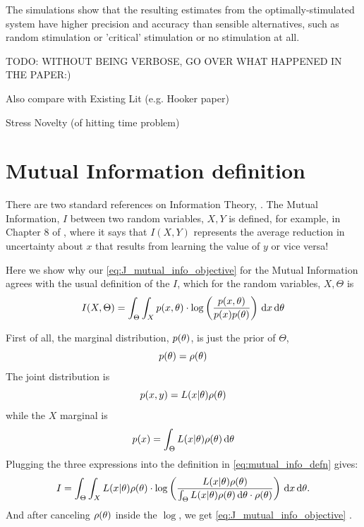 \documentclass{article}
\begin{document}
The simulations show that the resulting estimates from the
optimally-stimulated system have higher precision and accuracy than sensible
alternatives, such as random stimulation or 'critical' stimulation or no
 stimulation at all.
 
TODO: WITHOUT BEING VERBOSE, GO OVER WHAT HAPPENED IN THE PAPER:)

Also compare with Existing Lit (e.g. Hooker paper)

Stress Novelty (of hitting time problem)
 

\clearpage
\appendix
\section{Mutual Information definition}
\label{sec:mutual_info_defn} 

There are two standard references on Information Theory, 
\cite{Cover2006,MacKay2003}. The Mutual Information, $I$ between two random
variables, $X,Y$ is defined, for example, in Chapter 8 of \cite{MacKay2003},
where it says that $I(X,Y)$ represents the average reduction in uncertainty
about $x$ that results from learning the value of $y$ or vice versa! 

Here we show why our \cref{eq:J_mutual_info_objective} for the Mutual
Information agrees with the usual definition of the $I$,
which for the random variables, $X,\Theta$ is
\begin{equation} 
I(X,\Theta) = \int_\Theta \int_X p(x,{\theta}) \cdot \log \left(
\frac{p(x,{\theta})}{p(x)p({\theta})}\right) \, \mathrm{d} x \, \mathrm{d} {\theta}
\label{eq:mutual_info_defn}
\end{equation}
 
First of all, the marginal distribution, $p({\theta})$,  is just the prior of
$\Theta$, $$p({\theta}) = \rho({\theta})$$ The joint distribution is $$p(x,y) =
L(x|{\theta})\rho({\theta})$$ while the $X$ marginal is $$p(x) = \int_\Theta L(x|{\theta})\rho({\theta}) \, \mathrm{d} {\theta}$$
Plugging the three expressions into the definition in
\cref{eq:mutual_info_defn} gives:
\begin{equation}
I = \int_\Theta \int_X L(x|{\theta})\rho({\theta}) \cdot 
\log \left( \frac{L(x|{\theta})\rho({\theta}) }{\int_\Theta L(x|{\theta})\rho({\theta}) \, \mathrm{d} {\theta}
\cdot \rho({\theta}) } \right)
\, \mathrm{d} x\, \mathrm{d} {\theta}.
\label{eq:mutual_info_prior_trajectory}
\end{equation}
And after canceling $\rho({\theta})$ inside the $\log$, we get
\cref{eq:J_mutual_info_objective} .

\clearpage
\end{document}
